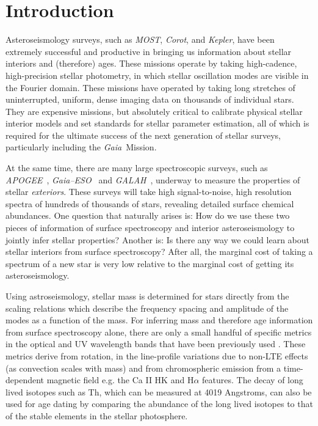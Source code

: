 \documentclass[12pt, preprint]{aastex}
\newcommand{\project}[1]{\textsl{#1}}
\newcommand{\apogee}{\project{APOGEE}}
\newcommand{\corot}{\project{Corot}}
\newcommand{\kepler}{\project{Kepler}}
\newcommand{\gaia}{\project{Gaia}}
\newcommand{\gaiaeso}{\project{Gaia--ESO}}
\newcommand{\galah}{\project{GALAH}}
\newcommand{\most}{\project{MOST}}
\begin{document}

\section{Introduction}\label{sec:Intro}

Asteroseismology surveys, such as \most, \corot, and \kepler, have
been extremely successful and productive in bringing us information
about stellar interiors and (therefore) ages.
These missions operate by taking high-cadence, high-precision stellar
photometry, in which stellar oscillation modes are visible in the
Fourier domain.
These missions have operated by taking long stretches of
uninterrupted, uniform, dense imaging data on thousands of individual
stars.
They are expensive missions, but absolutely critical to calibrate
physical stellar interior models and set standards for stellar
parameter estimation, all of which is required for the ultimate
success of the next generation of stellar surveys, particularly
including the \gaia\ Mission.

At the same time, there are many large spectroscopic surveys, such
as \apogee\ \citep{Majewski2012}, \gaiaeso\ \citep{Gilmore2012} and \galah\ \citep{Freeman2012}, underway to measure the properties
of stellar \emph{exteriors}.
These surveys will take high signal-to-noise, high resolution spectra
of hundreds of thousands of stars, revealing detailed surface chemical
abundances.
One question that naturally arises is:
How do we use these two pieces of information of surface spectroscopy
and interior asteroseismology to jointly infer stellar properties?
Another is:
Is there any way we could learn about stellar interiors from surface
spectroscopy?
After all, the marginal cost of taking a spectrum of
a new star is very low relative to the marginal cost of getting its
asteroseismology.

Using astroseismology, stellar mass is determined for stars directly from the scaling relations which describe the frequency spacing and amplitude of the modes as a function of the mass. For inferring mass and therefore age information from surface spectroscopy alone, there are only a small handful of specific metrics in the optical and UV wavelength bands that have been previously used  \citep[see][and references therein]{soderblom2010}. These metrics derive from rotation, in the line-profile variations due to non-LTE effects (as convection scales with mass) and from chromospheric emission from a time-dependent magnetic field e.g. the Ca II HK and H$\alpha$ features. The decay of long lived isotopes such as Th, which can be measured at 4019 Angstroms, can also be used for age dating by comparing the abundance of the long lived isotopes to that of the stable elements in the stellar photosphere. 
\end{document}
